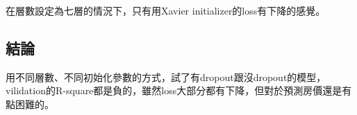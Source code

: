 \documentclass[conference,twocolumn]{IEEEtran}
\theoremstyle{definition}
\begin{document}
\begin{singlespace}

在層數設定為七層的情況下，只有用Xavier initializer的loss有下降的感覺。
\end{singlespace}
\begin{singlespace}

\end{singlespace}
\begin{singlespace}
\section{結論}
用不同層數、不同初始化參數的方式，試了有dropout跟沒dropout的模型，vilidation的R-square都是負的，雖然loss大部分都有下降，但對於預測房價還是有點困難的。
\end{singlespace}
\end{document}
